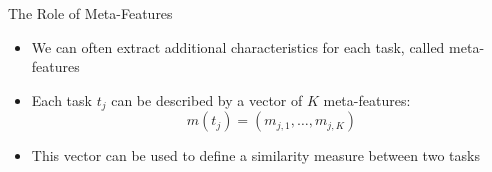 \begin{frame}[c]{The Role of Meta-Features}

\begin{itemize}
    \item We can often extract additional characteristics for each task, called \alert{meta-features}
    \item Each task $t_j$ can be described by a vector of $K$ meta-features:
        \begin{equation*}
            m(t_j) = (m_{j, 1}, \dots, m_{j, K})
        \end{equation*}
\medskip
\fhpause
    \item This vector can be used to define a \alert{similarity measure} between two tasks
\end{itemize}

\end{frame}







